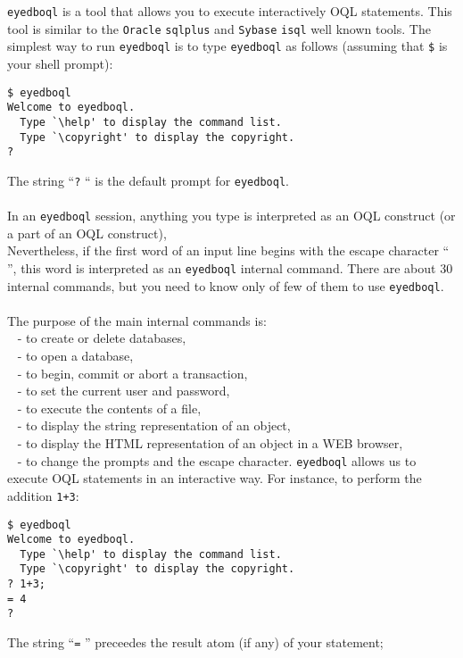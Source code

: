 \texttt{eyedboql} is a tool that allows you to execute interactively OQL 
statements.
This tool is similar to the \texttt{Oracle} \texttt{sqlplus} and \texttt{Sybase}
\texttt{isql} well known tools.
The simplest way to run \texttt{eyedboql} is to type \texttt{eyedboql}
as follows (assuming that \texttt{\$} is your shell prompt):
\verbsize
\begin{verbatim}
$ eyedboql
Welcome to eyedboql.
  Type `\help' to display the command list.
  Type `\copyright' to display the copyright.
?
\end{verbatim}
\normalsize
The string ``\texttt{?} `` is the default prompt for \texttt{eyedboql}.
\\
\\
In an \texttt{eyedboql} session, anything you type is interpreted as an
OQL construct (or a part of an OQL construct),
\\
Nevertheless, if the first word of an input line begins with the escape
character ``\texttt{\\}'', this word is interpreted as an \texttt{eyedboql}
internal command.
There are about 30 internal commands, but you need to know only of few of them
to use \texttt{eyedboql}.\\
\\
The purpose of the main internal commands is:\\
\mbox{ } - to create or delete databases,\\
\mbox{ } - to open a database,\\
\mbox{ } - to begin, commit or abort a transaction,\\
\mbox{ } - to set the current user and password,\\
\mbox{ } - to execute the contents of a file,\\
\mbox{ } - to display the string representation of an object,\\
\mbox{ } - to display the HTML representation of an object in a WEB browser,\\
\mbox{ } - to change the prompts and the escape character.
\texttt{eyedboql} allows us to execute OQL statements in an interactive way.
For instance, to perform the addition \texttt{1+3}:
\verbsize
\begin{verbatim}
$ eyedboql
Welcome to eyedboql.
  Type `\help' to display the command list.
  Type `\copyright' to display the copyright.
? 1+3;
= 4
?
\end{verbatim}
\normalsize
The string ``\texttt{=} '' preceedes the result atom (if any) of your statement;
